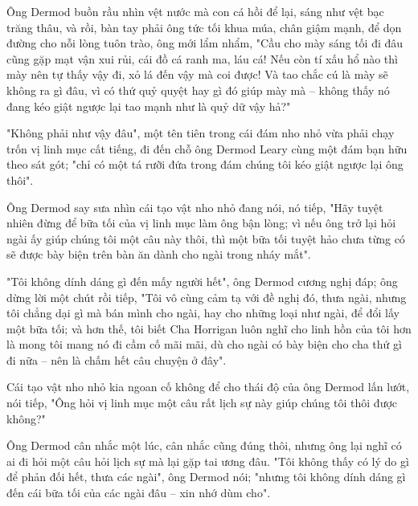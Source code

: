 Ông Dermod buồn rầu nhìn vệt nước mà con cá hồi để lại, sáng như vệt bạc trăng thâu, và rồi, bàn tay phải ông tức tối khua múa, chân giậm mạnh, để dọn đường cho nỗi lòng tuôn trào, ông mới lẩm nhẩm, "Cầu cho mày sáng tối đi đâu cũng gặp mạt vận xui rủi, cái đồ cá ranh ma, láu cá! Nếu còn tí xấu hổ nào thì mày nên tự thấy vậy đi, xỏ lá đến vậy mà coi được! Và tao chắc cú là mày sẽ không ra gì đâu, vì có thứ quỷ quyệt hay gì đó giúp mày mà – không thấy nó đang kéo giật ngược lại tao mạnh như là quỷ dữ vậy hả?"

"Không phải như vậy đâu", một tên tiên trong cái đám nho nhỏ vừa phải chạy trốn vị linh mục cất tiếng, đi đến chỗ ông Dermod Leary cùng một đám bạn hữu theo sát gót; "chỉ có một tá rưỡi đứa trong đám chúng tôi kéo giật ngược lại ông thôi".

Ông Dermod say sưa nhìn cái tạo vật nho nhỏ đang nói, nó tiếp, "Hãy tuyệt nhiên đừng để bữa tối của vị linh mục làm ông bận lòng; vì nếu ông trở lại hỏi ngài ấy giúp chúng tôi một câu này thôi, thì một bữa tối tuyệt hảo chưa từng có sẽ được bày biện trên bàn ăn dành cho ngài trong nháy mắt".

"Tôi không dính dáng gì đến mấy người hết", ông Dermod cương nghị đáp; ông dừng lời một chút rồi tiếp, "Tôi vô cùng cảm tạ với đề nghị đó, thưa ngài, nhưng tôi chẳng dại gì mà bán mình cho ngài, hay cho những loại như ngài, để đổi lấy một bữa tối; và hơn thế, tôi biết Cha Horrigan luôn nghĩ cho linh hồn của tôi hơn là mong tôi mang nó đi cầm cố mãi mãi, dù cho ngài có bày biện cho cha thứ gì đi nữa – nên là chấm hết câu chuyện ở đây".

Cái tạo vật nho nhỏ kia ngoan cố không để cho thái độ của ông Dermod lấn lướt, nói tiếp, "Ông hỏi vị linh mục một câu rất lịch sự này giúp chúng tôi thôi được không?"

Ông Dermod cân nhắc một lúc, cân nhắc cũng đúng thôi, nhưng ông lại nghĩ có ai đi hỏi một câu hỏi lịch sự mà lại gặp tai ương đâu. "Tôi không thấy có lý do gì để phản đối hết, thưa các ngài", ông Dermod nói; "nhưng tôi không dính dáng gì đến cái bữa tối của các ngài đâu – xin nhớ dùm cho".
